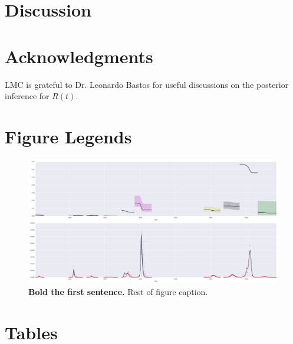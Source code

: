 \section*{Discussion}
\section*{Acknowledgments}
LMC is grateful to Dr. Leonardo Bastos for useful discussions on the 
posterior inference for $R(t)$.


\section*{Figure Legends}
%
\begin{figure}
\begin{center}
\includegraphics[width=.9\textwidth]{./plots/concat_SI.png}
\end{center}
\caption{
{\bf Bold the first sentence.}  Rest of figure caption.  
}
\label{Fig:S0}
\end{figure}





\section*{Tables}
% 
%
%

